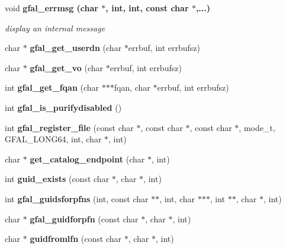 \begin{CompactItemize}
\item 
void \bf{gfal\_\-errmsg} (char $\ast$, int, int, const char $\ast$,...)
\begin{CompactList}\small\item\em display an internal message \item\end{CompactList}\item 
char $\ast$ \textbf{gfal\_\-get\_\-userdn} (char $\ast$errbuf, int errbufsz)\label{group__internal__group_g6bd6336b0fee1ff32ad6bc5ef3d96068}

\item 
char $\ast$ \textbf{gfal\_\-get\_\-vo} (char $\ast$errbuf, int errbufsz)\label{group__internal__group_g1d7294ee456d16c8b1bf40f97ffb5081}

\item 
int \textbf{gfal\_\-get\_\-fqan} (char $\ast$$\ast$$\ast$fqan, char $\ast$errbuf, int errbufsz)\label{group__internal__group_g54b4e29078838583c8022630ef5a2ed3}

\item 
int \textbf{gfal\_\-is\_\-purifydisabled} ()\label{group__internal__group_g3a35f0e6f616c5108f95cfffd557db77}

\item 
int \textbf{gfal\_\-register\_\-file} (const char $\ast$, const char $\ast$, const char $\ast$, mode\_\-t, GFAL\_\-LONG64, int, char $\ast$, int)\label{group__internal__group_gdb09f20d086253b45c5d2896be95b4a9}

\item 
char $\ast$ \textbf{get\_\-catalog\_\-endpoint} (char $\ast$, int)\label{gfal__common_8h_b3b834ff96e3d42df0404a02a9f8d1f5}

\item 
int \textbf{guid\_\-exists} (const char $\ast$, char $\ast$, int)\label{gfal__common_8h_7aea3a7b0803552b8f2a441f57d900a3}

\item 
int \textbf{gfal\_\-guidsforpfns} (int, const char $\ast$$\ast$, int, char $\ast$$\ast$$\ast$, int $\ast$$\ast$, char $\ast$, int)\label{group__internal__group_g72f2d9fb6a55816f243a4c57c5369fe5}

\item 
char $\ast$ \textbf{gfal\_\-guidforpfn} (const char $\ast$, char $\ast$, int)\label{group__internal__group_g86568afb8c7f9b0d6944de793a3e867a}

\item 
char $\ast$ \textbf{guidfromlfn} (const char $\ast$, char $\ast$, int)\label{gfal__common_8h_47c91fab6a02d32fcc1c6d6a53ba2ce3}


\end{CompactItemize}
